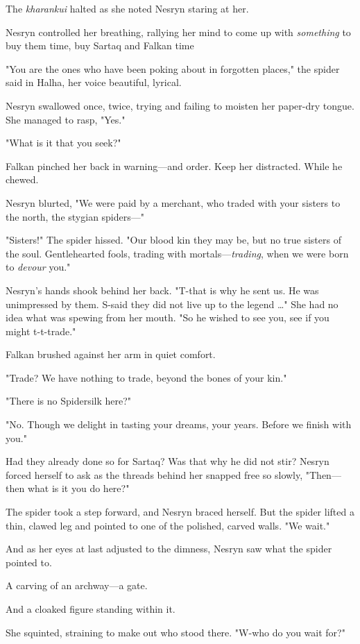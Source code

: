 The \emph{kharankui} halted as she noted Nesryn staring at her.

Nesryn controlled her breathing, rallying her mind to come up with
\emph{something} to buy them time, buy Sartaq and Falkan time 

"You are the ones who have been poking about in forgotten places," the spider said in Halha, her voice beautiful, lyrical.

Nesryn swallowed once, twice, trying and failing to moisten her paper-dry tongue. She managed to rasp, "Yes."

"What is it that you seek?"

Falkan pinched her back in warning---and order. Keep her distracted. While he chewed.

Nesryn blurted, "We were paid by a merchant, who traded with your sisters to the north, the stygian spiders---"

"Sisters!" The spider hissed. "Our blood kin they may be, but no true sisters of the soul. Gentlehearted fools, trading with mortals---\emph{trading}, when we were born to \emph{devour} you."

Nesryn's hands shook behind her back. "T-that is why he sent us. He was unimpressed by them. S-said they did not live up to the legend \ldots" She had no idea what was spewing from her mouth. "So he wished to see you, see if you might t-t-trade."

Falkan brushed against her arm in quiet comfort.

"Trade? We have nothing to trade, beyond the bones of your kin."

"There is no Spidersilk here?"

"No. Though we delight in tasting your dreams, your years. Before we finish with you."

Had they already done so for Sartaq? Was that why he did not stir? Nesryn forced herself to ask as the threads behind her snapped free so slowly, "Then--- then what is it you do here?"

The spider took a step forward, and Nesryn braced herself. But the spider lifted a thin, clawed leg and pointed to one of the polished, carved walls. "We wait."

And as her eyes at last adjusted to the dimness, Nesryn saw what the spider pointed to.

A carving of an archway---a gate.

And a cloaked figure standing within it.

She squinted, straining to make out who stood there. "W-who do you wait for?"

